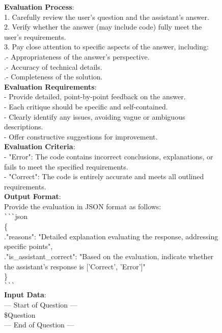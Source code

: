 \documentclass[11pt, a4paper, logo, copyright, nonumbering, amsart]{map}
\begin{document}
\begin{CJK*}{UTF8}{gbsn}
\begin{figure*}[h!]
\begin{center}
\begin{tcolorbox}[width=1\textwidth, colback=lightblue, title={\textbf{Basic Critique Evaluation Judge Prompt}}]
    \textbf{Evaluation Process}:\\
    1. Carefully review the user’s question and the assistant’s answer.\\
    2. Verify whether the answer (may include code) fully meet the user’s requirements.\\
    3. Pay close attention to specific aspects of the answer, including:\\
    .\quad - Appropriateness of the answer’s perspective.\\ 
    .\quad - Accuracy of technical details.\\
    .\quad - Completeness of the solution.\\
    
    \textbf{Evaluation Requirements}:\\
    - Provide detailed, point-by-point feedback on the answer.\\
    - Each critique should be specific and self-contained.\\
    - Clearly identify any issues, avoiding vague or ambiguous descriptions.\\
    - Offer constructive suggestions for improvement.\\
    
    \textbf{Evaluation Criteria}:\\
    - "Error": The code contains incorrect conclusions, explanations, or fails to meet the specified requirements.\\
    - "Correct": The code is entirely accurate and meets all outlined requirements.\\
    
    \textbf{Output Format}:\\
    Provide the evaluation in JSON format as follows:\\
    \verb|```|json\\
    \{\\
        .\quad"reasons": "Detailed explanation evaluating the response, addressing specific points",\\
        .\quad"is\_assistant\_correct": "Based on the evaluation, indicate whether the assistant's response is ['Correct', 'Error']"\\
    \}\\
    \verb|```|\\
    
    \textbf{Input Data}:\\
    --- Start of Question ---\\
    \textcolor{ora}{\$Question}\\
    --- End of Question ---\\
    

\end{tcolorbox}
\end{center}
\end{figure*}
\end{CJK*}
\end{document}
